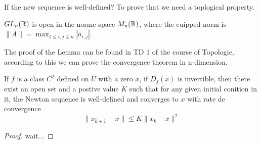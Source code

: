 \documentclass[en,hazy,black,pc,12pt]{elegantnote}
\begin{document}
If the new sequence is well-defined? To prove that we need a toplogical property.

\begin{lemma}
    \( GL_n(\mathbb{R})\) is open in the norme space \(M_n( \mathbb{R} ) \), where the euipped norm is \(\|A\| = \max_{ 1 \leq i,j \leq n} |a_{i,j}|\).
\end{lemma}

The proof of the Lemma can be found in TD 1 of the course of Topologie, according to this we can prove the convergence theorem in n-dimension.

\begin{theorem}
    If \(f\) is a class \(C^2\) defined on \(U\) with a zero \(x\), if \(D_f(x)\) is invertible, then there exist an open set and a postive value \(K\)  such that for any given initial conition in it, the Newton sequence is well-defined and converges to \(x\) with rate de convergence
    \[\|x_{k+1}-x\| \leq K \|x_k-x\|^2\]
    
    \begin{proof}
        wait...
    \end{proof}
\end{theorem}

\section{}
\end{document}
